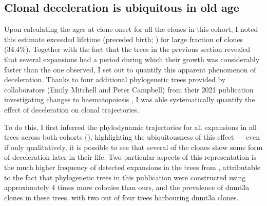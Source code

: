 \begin{figure}[!ht]
	\label{fig:trees-coefficients-ages-at-onset}
\end{figure}

\subsection{Clonal deceleration is ubiquitous in old age}

Upon calculating the ages at clone onset for all the clones in this cohort, I noted this estimate exceeded lifetime (preceded birth; ) for large fraction of clones (34.4\%). Together with the fact that the trees in the previous section revealed that several expansions had a period during which their growth was considerably faster than the one observed, I set out to quantify this apparent phenomenon of deceleration. Thanks to four additional phylogenetic trees provided by collaborators (Emily Mitchell and Peter Campbell) from their 2021 publication investigating changes to haematopoiesis \cite{Mitchell2021-zl}, I was able systematically quantify the effect of deceleration on clonal trajectories.

\begin{figure}[!ht]
	\label{fig:exceeds-within-lifetime-representation}
\end{figure}

To do this, I first inferred the phylodynamic trajectories for all expansions in all trees across both cohorts (), highlighting the ubiquitousness of this effect --- even if only qualitatively, it is possible to see that several of the clones show some form of deceleration later in their life. Two particular aspects of this representation is the much higher frequency of detected expansions in the trees from , attributable to the fact that phylogenetic trees in this publication were constructed using approximately 4 times more colonies than ours, and the prevalence of \ac{dnmt3a} clones in these trees, with two out of four trees harbouring \ac{dnmt3a} clones.

